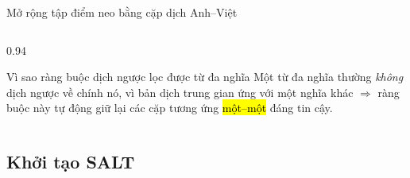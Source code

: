 \begin{frame}{Mở rộng tập điểm neo bằng cặp dịch Anh--Việt}
\vspace{0.4em}
\begin{columns}[T]
\begin{column}{0.94\textwidth}
  \begin{block}{Vì sao ràng buộc dịch ngược lọc được từ đa nghĩa}
    \small Một từ đa nghĩa thường \emph{không} dịch ngược về chính nó, vì bản
    dịch trung gian ứng với một nghĩa khác $\Rightarrow$ ràng buộc này tự động
    giữ lại các cặp tương ứng \hl{một--một} đáng tin cậy.
  \end{block}
\end{column}
\end{columns}
\end{frame}

\subsection{Khởi tạo SALT}

